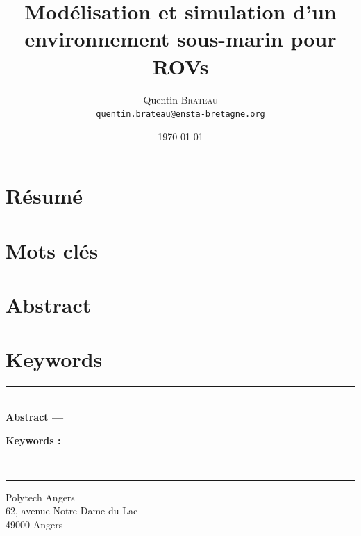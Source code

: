 \documentclass{rapport}
\title{Modélisation et simulation d'un environnement sous-marin pour ROVs}
\author{Quentin \textsc{Brateau} \\ \texttt{quentin.brateau@ensta-bretagne.org}}
\date{\today}
\begin{document}
	\frontmatter
	
	\maketitle

	\pagestyle{plain}
	\cleardoublepage

	\section*{Résumé}
	
	\section*{Mots clés}
	

	\section*{Abstract}
	
	\section*{Keywords}
	
	
	\clearpage

	\tableofcontents

	\mainmatter
	\pagestyle{fancy}
	
	
	
	
	
	
	
	
	\appendix
	\cleardoublepage
	

	\clearpage
	\label{chapter:lof}
	\listoffigures

	\clearpage
	\label{chapter:lot}
	\listoftables

	\clearpage
	\label{sec:glossaire}
	\printglossaries

	\clearpage

	
	

	\pagestyle{plain}
	\cleartoleftpage
	
	\vspace*{\fill}
	\noindent\rule[2pt]{\textwidth}{0.5pt}\\
	\textbf{Abstract ---}
	

	{\textbf{Keywords :}}
	
	\\
	\noindent\rule[2pt]{\textwidth}{0.5pt}
	\begin{center}
		Polytech Angers\\
		62, avenue Notre Dame du Lac\\
		49000 Angers
	\end{center}
	\vspace*{\fill}
\end{document}
